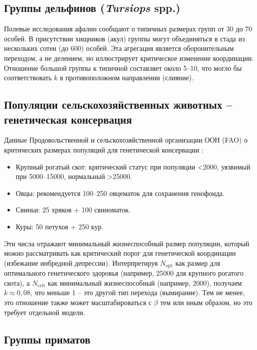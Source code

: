 \documentclass[12pt]{article}
\theoremstyle{remark}
\begin{document}
	\subsection{Группы дельфинов (\textit{Tursiops} spp.)}
	\label{subsec:dolphins}
	
	Полевые исследования афалин \cite{Connor2000} сообщают о типичных размерах групп от 30 до 70 особей. В присутствии хищников (акул) группы могут объединяться в стада из нескольких сотен (до 600) особей. Эта агрегация является оборонительным переходом, а не делением, но иллюстрирует критическое изменение координации. Отношение большой группы к типичной составляет около 5–10, что могло бы соответствовать $k$ в противоположном направлении (слияние).
	
	\subsection{Популяции сельскохозяйственных животных – генетическая консервация}
	\label{subsec:livestock}
	
	Данные Продовольственной и сельскохозяйственной организации ООН (FAO) о критических размерах популяций для генетической консервации \cite{FAO2013}:
	\begin{itemize}
		\item Крупный рогатый скот: критический статус при популяции <2000, уязвимый при 5000–15000, нормальный >25000.
		\item Овцы: рекомендуется 100–250 овцематок для сохранения генофонда.
		\item Свиньи: 25 хряков + 100 свиноматок.
		\item Куры: 50 петухов + 250 кур.
	\end{itemize}
	Эти числа отражают минимальный жизнеспособный размер популяции, который можно рассматривать как критический порог для генетической координации (избежание инбредной депрессии). Интерпретируя $N_{\text{opt}}$ как размер для оптимального генетического здоровья (например, 25000 для крупного рогатого скота), а $N_{\text{crit}}$ как минимальный жизнеспособный (например, 2000), получаем $k \approx 0,08$, что меньше 1 – это другой тип перехода (вымирание). Тем не менее, это отношение также может масштабироваться с $\beta$ тем или иным образом, но это требует отдельной модели.
	
	\subsection{Группы приматов}
	\label{subsec:primates}
	
\end{document}

